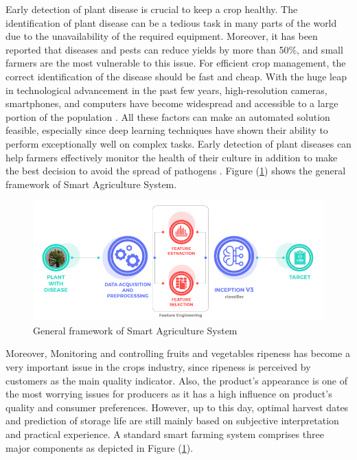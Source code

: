 Early detection of plant disease is crucial to keep a crop healthy. 
The identification of plant disease can be a tedious task in many parts of 
the world due to the unavailability of the required equipment. Moreover, 
it has been reported that diseases and pests can reduce yields by more than 
50\%, and small farmers are the most vulnerable to this issue. For efficient 
crop management, the correct identification of the disease should be fast and cheap. 
With the huge leap in technological advancement in the past few years, high-resolution 
cameras, smartphones, and computers have become widespread and accessible to a large 
portion of the population \cite{moh16}.
All these factors can make an automated solution feasible, especially since deep learning 
techniques have shown their ability to perform exceptionally well on complex tasks. 
Early detection of plant diseases can help farmers effectively monitor the health of 
their culture in addition to make the best decision to avoid the spread of pathogens \cite{mas21}.
Figure (\ref{fig:framework}) shows the general framework of Smart Agriculture System.

\begin{figure}[H]
    \centering
    \includegraphics[width=14cm]{photos/chapter03/1.png}
    \caption{General framework of Smart Agriculture System}
    \label{fig:framework}
\end{figure}

Moreover, Monitoring and controlling fruits and vegetables ripeness has become a 
very important issue in the crops industry, since ripeness is perceived by customers 
as the main quality indicator. Also, the product's appearance is one of the most worrying 
issues for producers as it has a high influence on product's quality and consumer preferences. 
However, up to this day, optimal harvest dates and prediction of storage life are still mainly 
based on subjective interpretation and practical experience. A standard smart farming system 
comprises three major components as depicted in Figure (\ref{fig:framework}). \\

